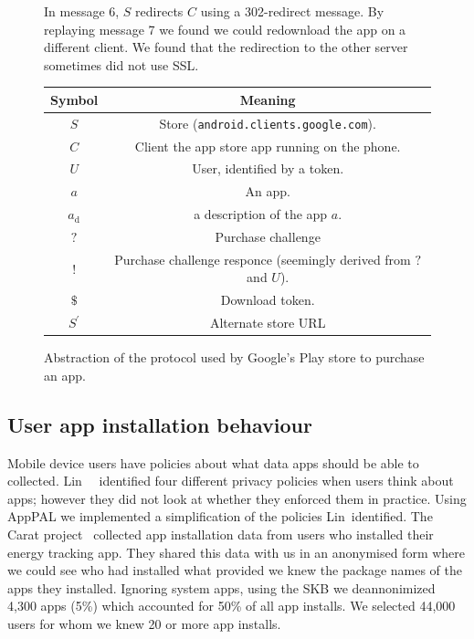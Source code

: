 \documentclass[a4paper]{scrartcl}
\begin{document}
\begin{figure}
\begin{minipage}{0.48\linewidth}
    {\footnotesize In message 6, $S$ redirects $C$ using a 302-redirect message.
      By replaying message 7 we found we could redownload the app on a different client.
      We found that the redirection to the other server sometimes did not use SSL.}
  \end{minipage}
  \begin{minipage}{0.48\linewidth}
    \begin{tabulary}{\linewidth}{cC}
      \toprule
      Symbol         & Meaning                                                           \\
      \midrule
      $S$            & Store (\texttt{android.clients.google.com}).                      \\
      $C$            & Client the app store app running on the phone.                    \\
      $U$            & User, identified by a token.                                      \\
      $a$            & An app.                                                           \\
      $a_{\text{d}}$ & a description of the app $a$.                                     \\
      $?$            & Purchase challenge                                                \\
      $!$            & Purchase challenge responce (seemingly derived from $?$ and $U$). \\
      $\$$           & Download token.                                                   \\
      $S^\prime$     & Alternate store URL                                               \\
      \bottomrule
    \end{tabulary}
  \end{minipage}
  \caption{Abstraction of the protocol used by Google's Play store to purchase an app.}
  \label{fig:protocol}
\end{figure}

\subsection{User app installation behaviour}

Mobile device users have policies about what data apps should be able to collected.
Lin~\etal~\citep{Sadeh:2014vq} identified four different privacy policies when users think about apps; however they did not look at whether they enforced them in practice.
Using AppPAL we implemented a simplification of the policies Lin~\etal identified.
The Carat project~\citep{Oliner:2013ht} collected app installation data from users who installed their energy tracking app.
They shared this data with us in an anonymised form where we could see who had installed what provided we knew the package names of the apps they installed.
Ignoring system apps, using the \ac{SKB} we deannonimized 4,300 apps (5\%) which accounted for 50\% of all app installs.
We selected 44,000 users for whom we knew 20 or more app installs.
\end{document}
